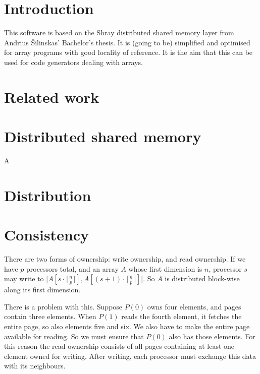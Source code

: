 \documentclass{article}
\begin{document}
\section*{Introduction}

This software is based on the Shray distributed shared memory layer from Andrius Šilinskas'
Bachelor's thesis. It is (going to be) simplified and optimised for array programs with 
good locality of reference. It is the aim that this can be used for code generators dealing
with arrays. 

\section{Related work}

\section{Distributed shared memory}

A

\section{Distribution}

\section{Consistency}

There are two forms of ownership: write ownership, and read ownership. If we have $p$ processors
total, and an array $A$ whose first dimension is $n$, processor $s$ may write to 
$[A[s \cdot \lceil \frac{n}{p} \rceil], A[(s + 1) \cdot \lceil \frac{n}{p} \rceil][$. So 
$A$ is distributed block-wise along its first dimension. 

\medskip


There is a problem with this. Suppose $P(0)$ owns four elements, and pages contain three 
elements. When $P(1)$ reads the fourth element, it fetches the entire page, so also elements
five and six. We also have to make the entire page available for reading. So we must ensure 
that $P(0)$ also has those elements. For this reason the read ownership consists of all pages
containing at least one element owned for writing. After writing, each processor must exchange
this data with its neighbours. 
\end{document}
